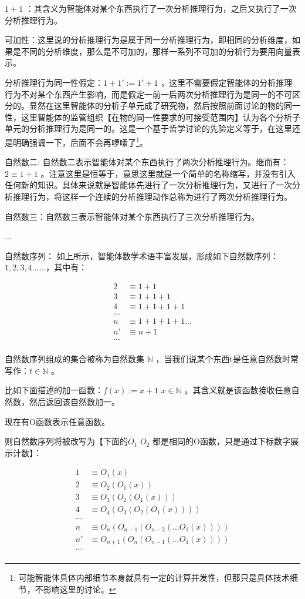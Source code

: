 \documentclass[12pt,oneside]{book}
\begin{document}
$1+1$ ：其含义为智能体对某个东西执行了一次分析推理行为，之后又执行了一次分析推理行为。

可加性：这里说的分析推理行为是属于同一分析推理行为，即相同的分析维度，如果是不同的分析维度，那么是不可加的，那样一系列不可加的分析行为要用向量表示。

分析推理行为同一性假定：$1+1' := 1'+1$ ，这里不需要假定智能体的分析推理行为不对某个东西产生影响，而是假定一前一后两次分析推理行为是同一的不可区分的。显然在这里智能体的分析子单元成了研究物，然后按照前面讨论的物的同一性，这里智能体的监管组织【在物的同一性要求的可接受范围内】认为各个分析子单元的分析推理行为是同一的。这是一个基于哲学讨论的先验定义等于，在这里还是明确强调一下，后面不会再啰嗦了\footnote{可能智能体具体内部细节本身就具有一定的计算并发性，但那只是具体技术细节，不影响这里的讨论。}。

自然数二:  自然数二表示智能体对某个东西执行了两次分析推理行为。继而有：$2 \equiv 1 + 1$ 。注意这里是恒等于，意思这里就是一个简单的名称缩写，并没有引入任何新的知识。具体来说就是智能体先进行了一次分析推理行为，又进行了一次分析推理行为，将这样一个连续的分析推理动作总称为进行了两次分析推理行为。

自然数三：自然数三表示智能体对某个东西执行了三次分析推理行为。

...

自然数序列： 如上所示，智能体数学术语丰富发展，形成如下自然数序列： $1, 2, 3, 4 ......$，其中有：


\begin{align*}
2 &\equiv 1 + 1 \\
3 &\equiv 1 + 1 + 1 \\
4 &\equiv 1 + 1 + 1 + 1 \\
...\\
n &\equiv 1 + 1 + 1 + 1 ...\\
n' &\equiv n + 1\\
...\\
\end{align*}


自然数序列组成的集合被称为自然数集 $ \mathbb{N} $ ，当我们说某个东西t是任意自然数时常写作：$ t \in \mathbb{N} $ 。

比如下面描述的加一函数：$f(x) := x +1$ $ x \in \mathbb{N} $ 。其含义就是该函数接收任意自然数，然后返回该自然数加一。

现在有O函数表示任意函数。

则自然数序列将被改写为【下面的$O_1$ $O_2$ 都是相同的O函数，只是通过下标数字展示计数】：

\begin{align*}
1 &\equiv O_1(x) \\
2 &\equiv O_2(O_1(x)) \\
3 &\equiv O_3(O_2(O_1(x))) \\
4 &\equiv O_4(O_3(O_2(O_1(x)))) \\
...\\
n &\equiv O_n(O_{n-1}(O_{n-2}(...O_1(x)))) \\
n' &\equiv O_{n+1}(O_n(O_{n-1}(...O_1(x))))\\
...\\
\end{align*}
\end{document}
